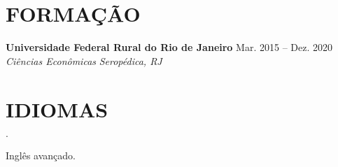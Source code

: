 \documentclass[12pt]{article}
\newenvironment{tightlist}
  {\begin{list}
    {$\cdot$}
    {
      \setlength{\leftmargin}{0em}
      \setlength{\itemsep}{\smallskipamount}
    }
  }
{\end{list}}
\begin{document}
\section*{FORMAÇÃO}

\textbf{Universidade Federal Rural do Rio de Janeiro} \hfill {Mar. 2015 -- Dez. 2020} \\
\textit{Ciências Econômicas} \hfill \textit{Seropédica, RJ} {\parfillskip=0pt\par}

\section*{IDIOMAS}

\begin{tightlist}
  \item Inglês avançado.
\end{tightlist}
\end{document}
